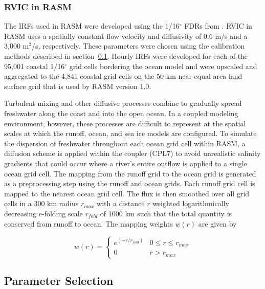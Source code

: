 \documentclass[jgrga, draft]{agutex}
\begin{document}
\begin{article}
\subsubsection{RVIC in RASM}

The IRFs used in RASM were developed using the 1/16$^{\circ}$ FDRs from \citet{Wu_2011}.
RVIC in RASM uses a spatially constant flow velocity and diffusivity of 0.6 m/s and a 3,000 m$^2$/s, respectively.
These parameters were chosen using the calibration methods described in section~\ref{sec:parameters}.
Hourly IRFs were developed for each of the 95,001 coastal 1/16$^{\circ}$ grid cells bordering the ocean model and were upscaled and aggregated to the 4,841 coastal grid cells on the 50-km near equal area land surface grid that is used by RASM version 1.0.

Turbulent mixing and other diffusive processes combine to gradually spread freshwater along the coast and into the open ocean.
In a coupled modeling environment, however, these processes are difficult to represent at the spatial scales at which the runoff, ocean, and sea ice models are configured.
To simulate the dispersion of freshwater throughout each ocean grid cell within RASM, a diffusion scheme is applied within the coupler (CPL7) to avoid unrealistic salinity gradients that could occur where a river's entire outflow is applied to a single ocean grid cell.
The mapping from the runoff grid to the ocean grid is generated as a preprocessing step using the runoff and ocean grids.
Each runoff grid cell is mapped to the nearest ocean grid cell.
The flux is then smoothed over all grid cells in a 300 km radius $r_{max}$ with a distance $r$ weighted logarithmically decreasing e-folding scale $r_{fold}$ of 1000 km such that the total quantity is conserved from runoff to ocean.
The mapping weights $w(r)$ are given by

\begin{equation}
  \label{eq:diffusion}
  w(r)=
     \begin{cases}
        e^{(-r/r_{fold})} & 0\leq r\leq r_{max} \\
        0 & r > r_{max}
     \end{cases}
\end{equation}

\subsection{Parameter Selection}
\label{sec:parameters}


\end{article}
\end{document}
